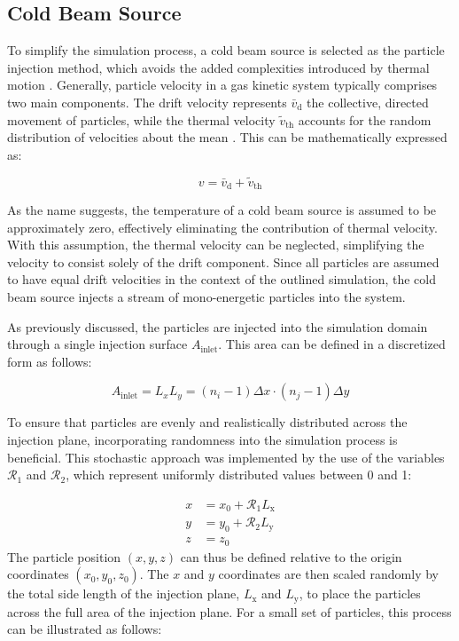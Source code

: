 \subsection{Cold Beam Source}

To simplify the simulation process, a cold beam source is selected as the particle injection method, which avoids the added complexities introduced by thermal motion \cite{brieda_plasma_2019}. Generally, particle velocity in a gas kinetic system typically comprises two main components. The drift velocity represents $\bar{v}_\mathrm{d}$ the collective, directed movement of particles, while the thermal velocity $\tilde{v}_\mathrm{th}$ accounts for the random distribution of velocities about the mean \cite{brieda_plasma_2019}. This can be mathematically expressed as:

\begin{equation}
    v = \bar{v}_\mathrm{d} + \tilde{v}_\mathrm{th}
\end{equation}

As the name suggests, the temperature of a cold beam source is assumed to be approximately zero, effectively eliminating the contribution of thermal velocity. With this assumption, the thermal velocity can be neglected, simplifying the velocity to consist solely of the drift component. Since all particles are assumed to have equal drift velocities in the context of the outlined simulation, the cold beam source injects a stream of mono-energetic particles into the system.

As previously discussed, the particles are injected into the simulation domain through a single injection surface $A_\mathrm{inlet}$. This area can be defined in a discretized form as follows:

\begin{equation}
    A_{\text{inlet}} = L_x L_y = (n_i - 1) \Delta x \cdot (n_j - 1) \Delta y
\end{equation}

To ensure that particles are evenly and realistically distributed across the injection plane, incorporating randomness into the simulation process is beneficial. This stochastic approach was implemented by the use of the variables $\mathcal{R}_1$ and $\mathcal{R}_2$, which represent uniformly distributed values between 0 and 1:

\begin{align}
    x &= x_0 + \mathcal{R}_1 L_\mathrm{x} \\
    y &= y_0 + \mathcal{R}_2 L_\mathrm{y} \\
    z &= z_0
\end{align}
The particle position $(x,y,z)$ can thus be defined relative to the origin coordinates $(x_0,y_0,z_0)$. The $x$ and $y$ coordinates are then scaled randomly by the total side length of the injection plane, $L_\mathrm{x}$ and $L_\mathrm{y}$, to place the particles across the full area of the injection plane. For a small set of particles, this process can be illustrated as follows:

